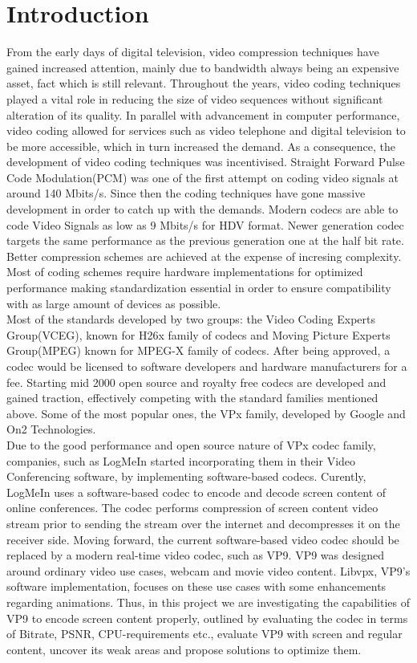 \documentclass[a4paper,11pt,oneside]{article}
\begin{document}
\section{Introduction}
\indent From the early days of digital television, video compression techniques have gained increased attention, mainly due to bandwidth always being
an expensive asset, fact which is still relevant. Throughout the years, video coding techniques played a vital role in reducing the size of video sequences without significant alteration of its quality. In parallel with advancement in computer performance, video coding allowed for services such as video telephone and digital
television to be more accessible, which in turn increased the demand. As a consequence, the development of video coding techniques was incentivised.
Straight Forward Pulse Code Modulation(PCM) was one of the first attempt on coding video signals at around 140 Mbits/s. Since then the coding techniques have gone massive development in order to catch up with the demands. Modern codecs are able to code Video Signals as low as 9 Mbits/s for HDV format. Newer generation codec targets the same performance as the previous generation one at the half bit rate. Better compression schemes are achieved at the expense of incresing complexity. Most of coding schemes require hardware implementations for optimized performance making standardization essential in order to ensure compatibility with as large amount of devices
as possible.\cite{ghanbari2011standard}\\
\indent Most of the standards developed by two groups: the Video Coding Experts Group(VCEG), known for H26x family of codecs and Moving Picture Experts Group(MPEG) known for MPEG-X family of codecs. After being approved, a codec would be licensed to software developers and hardware manufacturers for a fee. Starting mid 2000 open source and royalty free codecs are developed and gained traction, effectively competing with the standard families mentioned above. Some of the most popular ones, the VPx family, developed by Google and On2 Technologies. \\
\indent Due to the good performance and open source nature of VPx codec family, companies, such as LogMeIn started incorporating them in their Video Conferencing software, by implementing software-based codecs. Curently, LogMeIn uses a software-based codec to encode and decode screen content of online conferences. The codec performs compression of screen content video stream prior to sending the stream over the internet and decompresses it on the receiver side. Moving forward, the current software-based video codec should be replaced by a modern real-time video codec, such as VP9. VP9 was designed around ordinary video use cases, webcam and movie video content. Libvpx, VP9’s software implementation, focuses on these use cases with some enhancements regarding animations. Thus, in this project we are investigating the capabilities of VP9 to encode screen content properly, outlined by evaluating the codec in terms of Bitrate, PSNR, CPU-requirements etc., evaluate VP9 with screen and regular content, uncover its weak areas and propose solutions to optimize them.\\
\end{document}
